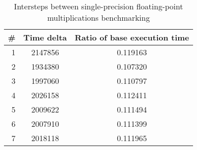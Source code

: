 \begin{table}
\centering
\begin{tabular}{rcc}
\# & Time delta & Ratio of base execution time\\
\hline
1 & 2147856 & 0.119163 \\
2 & 1934380 & 0.107320 \\
3 & 1997060 & 0.110797 \\
4 & 2026158 & 0.112411 \\
5 & 2009622 & 0.111494 \\
6 & 2007910 & 0.111399 \\
7 & 2018118 & 0.111965 \\
\end{tabular}
\caption{Intersteps between single-precision floating-point multiplications benchmarking}
\end{table}
